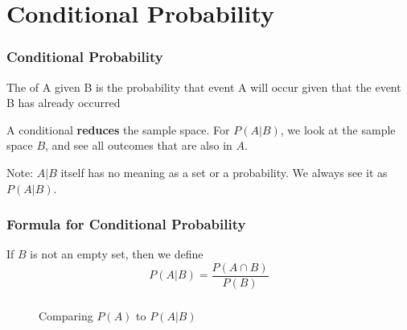 \section[Conditional]{Conditional Probability}
\frame{\sectionpage}

\begin{frame}
\frametitle{Conditional Probability}

\begin{block}{}
\begin{description}
\item[$P(A | B)$] The  of A given B is the probability that event A will occur given that the event B has already occurred

\item A conditional \textbf{reduces} the sample space. For $P(A|B)$, we look at the sample space $B$, and see all outcomes that are also in $A$.
\end{description}
\end{block}
Note: $A|B$ itself has no meaning as a set or a probability. We always see it as $P(A|B)$.

\frametitle{Formula for Conditional Probability}
\begin{defn}{}{}
If $B$ is not an empty set, then we define
\begin{equation}
P(A|B) = \frac{P(A \cap B)}{P(B)}
\end{equation}
\end{defn}
\end{frame}



\begin{frame}
\frametitle{}
\begin{figure}[h!]
\centering
{}
\caption{Comparing $P(A)$ to $P(A|B)$}
\end{figure}
\end{frame}


